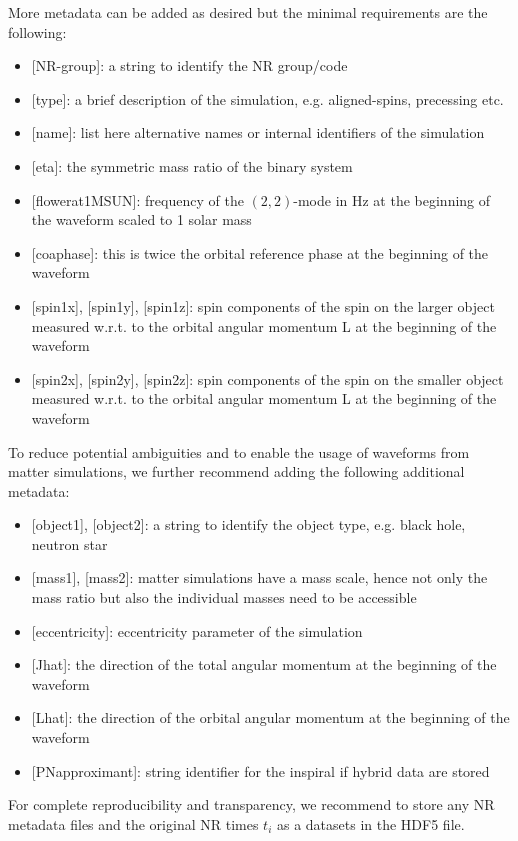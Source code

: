 \documentclass[aps,prd,amssymb,amsmath,amsfonts,superscriptaddress,
floatfix ,preprintnumbers,altaffilletter]{revtex4}
\begin{document}
More metadata can be added as desired but the minimal requirements are the following: \\
\begin{itemize}
\item {[}NR-group{]}: a string to identify the NR group/code
\item {[}type{]}: a brief description of the simulation, e.g. aligned-spins, precessing etc.
\item{[}name{]}: list here alternative names or internal identifiers of the simulation
\item{[}eta{]}: the symmetric mass ratio of the binary system
\item{[}f\textunderscore lower\textunderscore at\textunderscore 1MSUN{]}: frequency of the $(2,2)$-mode in Hz at the beginning of the waveform scaled to 1 solar mass
\item{[}coa\textunderscore phase{]}: this is twice the orbital reference phase at the beginning of the waveform
\item{[}spin1x{]}, {[}spin1y{]}, {[}spin1z{]}: spin components of the spin on the larger object measured w.r.t. to the orbital angular momentum L at the beginning of the waveform
\item{[}spin2x{]}, {[}spin2y{]}, {[}spin2z{]}: spin components of the spin on the smaller object measured w.r.t. to the orbital angular momentum L at the beginning of the waveform
\end{itemize}
To reduce potential ambiguities and to enable the usage of waveforms from matter simulations, we further recommend adding the following  additional metadata:
\begin{itemize}
\item{[}object1{]}, {[}object2{]}: a string to identify the object type, e.g. black hole, neutron star
\item{[}mass1{]}, {[}mass2{]}: matter simulations have a mass scale, hence not only the mass ratio but also the individual masses need to be accessible
\item{[}eccentricity{]}: eccentricity parameter of the simulation
\item{[}J\textunderscore hat{]}: the direction of the total angular momentum at the beginning of the waveform
\item{[}L\textunderscore hat{]}: the direction of the orbital angular momentum at the beginning of the waveform
\item{[}PN\textunderscore approximant{]}: string identifier for the inspiral if hybrid data are stored
\end{itemize}
For complete reproducibility and transparency, we recommend to store any NR metadata files and the original NR times $t_i$ as a datasets in the HDF5 file.
\end{document}
